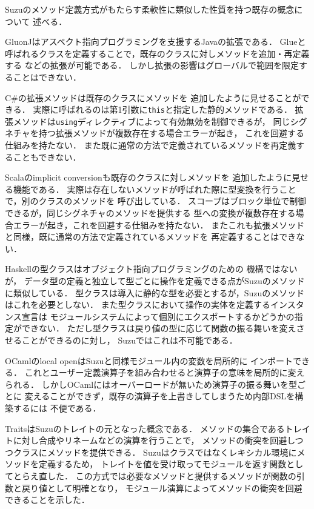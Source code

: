 \documentclass[a4paper,11pt,dvipdfmx]{jreport}
\begin{document}
Suzuのメソッド定義方式がもたらす柔軟性に類似した性質を持つ既存の概念について
述べる．

GluonJ\cite{GluonJ}はアスペクト指向プログラミングを支援するJavaの拡張である．
Glueと呼ばれるクラスを定義することで，既存のクラスに対しメソッドを追加・再定義する
などの拡張が可能である．
しかし拡張の影響はグローバルで範囲を限定することはできない．

C\#の拡張メソッド\cite{ExtentionMethods}は既存のクラスにメソッドを
追加したように見せることができる．
実際に呼ばれるのは第1引数に\verb|this|と指定した静的メソッドである．
拡張メソッドは\verb|using|ディレクティブによって有効無効を制御できるが，
同じシグネチャを持つ拡張メソッドが複数存在する場合エラーが起き，
これを回避する仕組みを持たない．
また既に通常の方法で定義されているメソッドを再定義することもできない．

Scala\cite{Scala}のimplicit conversionも既存のクラスに対しメソッドを
追加したように見せる機能である．
実際は存在しないメソッドが呼ばれた際に型変換を行うことで，別のクラスのメソッドを
呼び出している．
スコープはブロック単位で制御できるが，同じシグネチャのメソッドを提供する
型への変換が複数存在する場合エラーが起き，これを回避する仕組みを持たない．
またこれも拡張メソッドと同様，既に通常の方法で定義されているメソッドを
再定義することはできない．

Haskellの型クラス\cite{TypeClasses}はオブジェクト指向プログラミングのための
機構ではないが，
データ型の定義と独立して型ごとに操作を定義できる点がSuzuのメソッドに類似している．
型クラスは導入に静的な型を必要とするが，Suzuのメソッドはこれを必要としない．
また型クラスにおいて操作の実体を定義するインスタンス宣言は
モジュールシステムによって個別にエクスポートするかどうかの指定ができない．
ただし型クラスは戻り値の型に応じて関数の振る舞いを変えさせることができるのに対し，
Suzuではこれは不可能である．

OCaml\cite{OCaml}のlocal openはSuzuと同様モジュール内の変数を局所的に
インポートできる．
これとユーザー定義演算子を組み合わせると演算子の意味を局所的に変えられる．
しかしOCamlにはオーバーロードが無いため演算子の振る舞いを型ごとに
変えることができず，既存の演算子を上書きしてしまうため内部DSLを構築するには
不便である．

Traits\cite{Traits,ApplyingTraits}はSuzuのトレイトの元となった概念である．
メソッドの集合であるトレイトに対し合成やリネームなどの演算を行うことで，
メソッドの衝突を回避しつつクラスにメソッドを提供できる．
Suzuはクラスではなくレキシカル環境にメソッドを定義するため，
トレイトを値を受け取ってモジュールを返す関数としてとらえ直した．
この方式では必要なメソッドと提供するメソッドが関数の引数と戻り値として明確となり，
モジュール演算によってメソッドの衝突を回避できることを示した．
\end{document}
